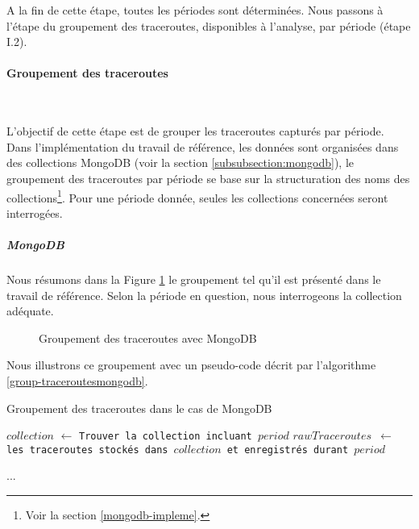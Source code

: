 A la fin de cette étape, toutes les périodes sont déterminées. Nous passons à l'étape du groupement des traceroutes, disponibles à l'analyse, par période (étape I.2).

\paragraph{Groupement des traceroutes}~

L'objectif de cette étape est de grouper les traceroutes capturés par période. 
Dans l'implémentation du travail de référence\cite{DBLP:journals/corr/FontugneAPB16}, les données sont organisées dans des collections MongoDB (voir la section \ref{subsubsection:mongodb}), le groupement des traceroutes par période se base sur la structuration des noms des collections\footnote{Voir la section \ref{mongodb-impleme}.}. Pour une période donnée, seules les collections concernées  seront interrogées. 
 


\subparagraph{MongoDB}
Nous résumons dans la Figure \ref{fig:read-data-from-mongodb} le groupement  tel qu'il est présenté dans le travail de référence.  
Selon la période en question, nous interrogeons la collection  adéquate.

\begin{figure}[h]
	\centering
	
	\captionsetup{justification=centering}
	\resizebox{10cm}{6cm}{
	
}
	\caption{Groupement des traceroutes avec MongoDB}
	\label{fig:read-data-from-mongodb}
\end{figure}

Nous illustrons ce groupement avec un pseudo-code décrit par l'algorithme \ref{group-traceroutesmongodb}.

\begin{algorithm}[H]
	\caption{Groupement des traceroutes dans le cas de MongoDB}
	\label{group-traceroutesmongodb}
	\begin{algorithmic}
		
		\State $collection$ $\gets$ \texttt{Trouver la collection incluant $period$}
		\State \texttt{$rawTraceroutes$ $\gets$   les traceroutes stockés dans  $collection$ et enregistrés durant $period$}
		
     ...	
		\EndFor
	\end{algorithmic}
\end{algorithm}

